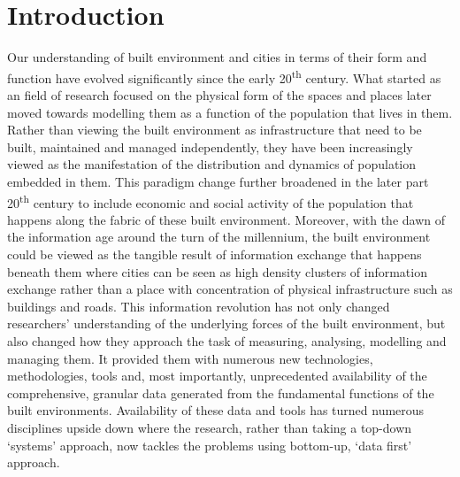 \chapter{Introduction}

Our understanding of built environment and cities in terms of their form and function have evolved significantly since the early 20\textsuperscript{th} century.
What started as an field of research focused on the physical form of the spaces and places later moved towards modelling them as a function of the population that lives in them. 
Rather than viewing the built environment as infrastructure that need to be built, maintained and managed independently, they have been increasingly viewed as the manifestation of the distribution and dynamics of population embedded in them.
This paradigm change further broadened in the later part 20\textsuperscript{th} century to include economic and social activity of the population that happens along the fabric of these built environment.
Moreover, with the dawn of the information age around the turn of the millennium, the built environment could be viewed as the tangible result of information exchange that happens beneath them where cities can be seen as high density clusters of information exchange rather than a place with concentration of physical infrastructure such as buildings and roads.
This information revolution has not only changed researchers' understanding of the underlying forces of the built environment, but also changed how they approach the task of measuring, analysing, modelling and managing them.
It provided them with numerous new technologies, methodologies, tools and, most importantly, unprecedented availability of the comprehensive, granular data generated from the fundamental functions of the built environments.
Availability of these data and tools has turned numerous disciplines upside down where the research, rather than taking a top-down `systems' approach, now tackles the problems using bottom-up, `data first' approach. 

